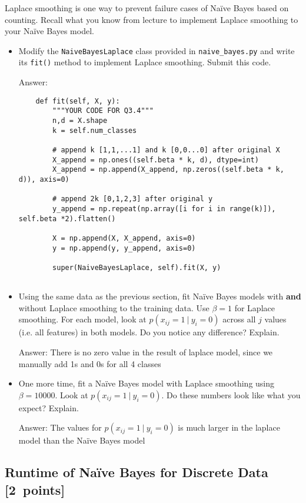 \documentclass{article}
\newcommand{\blu}[1]{{\textcolor{blu}{#1}}}
\newcommand{\gre}[1]{\textcolor{gre}{#1}}
\newcommand\ans[1]{\par\gre{Answer: #1}}
\newenvironment{answer}{\par\begingroup\color{gre}Answer: }{\endgroup}
\let\ask\blu
\newcommand\pts[1]{\textcolor{pointscolour}{[#1~points]}}
\begin{document}
    Laplace smoothing is one way to prevent failure cases of Na\"ive Bayes based on counting. Recall what you know from lecture to implement Laplace smoothing to your Na\"ive Bayes model.
    \begin{itemize}
        \item Modify the \texttt{NaiveBayesLaplace} class provided in \texttt{naive\_bayes.py} and write its \texttt{fit()} method to implement Laplace smoothing. \ask{Submit this code.}
        \begin{answer}
            \begin{verbatim}
    def fit(self, X, y):
        """YOUR CODE FOR Q3.4"""
        n,d = X.shape
        k = self.num_classes

        # append k [1,1,...1] and k [0,0...0] after original X
        X_append = np.ones((self.beta * k, d), dtype=int)
        X_append = np.append(X_append, np.zeros((self.beta * k, d)), axis=0)

        # append 2k [0,1,2,3] after original y
        y_append = np.repeat(np.array([i for i in range(k)]), self.beta *2).flatten()

        X = np.append(X, X_append, axis=0)
        y = np.append(y, y_append, axis=0)

        super(NaiveBayesLaplace, self).fit(X, y)
           
            \end{verbatim}
        \end{answer}
        \item Using the same data as the previous section, fit Na\"ive Bayes models with \textbf{and} without Laplace smoothing to the training data. Use $\beta=1$ for Laplace smoothing. For each model, look at $p(x_{ij} = 1 \ | \ y_i = 0)$ across all $j$ values (i.e. all features) in both models. \ask{Do you notice any difference? Explain.}
        \ans{There is no zero value in the result of laplace model, since we manually add 1s and 0s for all 4 classes}
        \item One more time, fit a Na\"ive Bayes model with Laplace smoothing using $\beta=10000$. Look at $p(x_{ij} = 1 \ | \ y_i = 0)$. \ask{Do these numbers look like what you expect? Explain.}
        \ans{The values for $p(x_{ij} = 1 \ | \ y_i = 0)$ is much larger in the laplace model than the Na\"ive Bayes model}
    \end{itemize}

    \subsection{Runtime of Na\"ive Bayes for Discrete Data \pts{2}}
\end{document}
